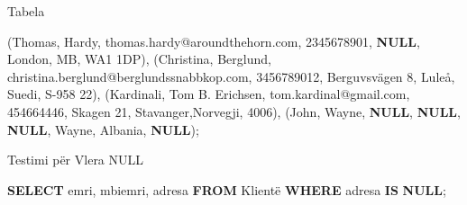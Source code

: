 \documentclass[
  ignorenonframetext,
]{beamer}
\newenvironment{Shaded}{\begin{snugshade}}{\end{snugshade}}
\newcommand{\KeywordTok}[1]{\textcolor[rgb]{0.13,0.29,0.53}{\textbf{#1}}}
\newcommand{\NormalTok}[1]{#1}
\newcommand{\StringTok}[1]{\textcolor[rgb]{0.31,0.60,0.02}{#1}}
\begin{document}
\begin{frame}[fragile]{Tabela}
\begin{Shaded}
\begin{Highlighting}[]
\NormalTok{(}\StringTok{\textquotesingle{}Thomas\textquotesingle{}}\NormalTok{, }\StringTok{\textquotesingle{}Hardy\textquotesingle{}}\NormalTok{, }\StringTok{\textquotesingle{}thomas.hardy@aroundthehorn.com\textquotesingle{}}\NormalTok{, }\StringTok{\textquotesingle{}2345678901\textquotesingle{}}\NormalTok{, }\KeywordTok{NULL}\NormalTok{, }\StringTok{\textquotesingle{}London\textquotesingle{}}\NormalTok{, }\StringTok{\textquotesingle{}MB\textquotesingle{}}\NormalTok{, }\StringTok{\textquotesingle{}WA1 1DP\textquotesingle{}}\NormalTok{),}
\NormalTok{(}\StringTok{\textquotesingle{}Christina\textquotesingle{}}\NormalTok{, }\StringTok{\textquotesingle{}Berglund\textquotesingle{}}\NormalTok{, }\StringTok{\textquotesingle{}christina.berglund@berglundssnabbkop.com\textquotesingle{}}\NormalTok{, }\StringTok{\textquotesingle{}3456789012\textquotesingle{}}\NormalTok{, }\StringTok{\textquotesingle{}Berguvsvägen 8\textquotesingle{}}\NormalTok{, }\StringTok{\textquotesingle{}Luleå\textquotesingle{}}\NormalTok{, }\StringTok{\textquotesingle{}Suedi\textquotesingle{}}\NormalTok{, }\StringTok{\textquotesingle{}S{-}958 22\textquotesingle{}}\NormalTok{),}
\NormalTok{(}\StringTok{\textquotesingle{}Kardinali\textquotesingle{}}\NormalTok{, }\StringTok{\textquotesingle{}Tom B. Erichsen\textquotesingle{}}\NormalTok{, }\StringTok{\textquotesingle{}tom.kardinal@gmail.com\textquotesingle{}}\NormalTok{, }\StringTok{\textquotesingle{}454664446\textquotesingle{}}\NormalTok{, }\StringTok{\textquotesingle{}Skagen 21\textquotesingle{}}\NormalTok{, }\StringTok{\textquotesingle{}Stavanger\textquotesingle{}}\NormalTok{,}\StringTok{\textquotesingle{}Norvegji\textquotesingle{}}\NormalTok{, }\StringTok{\textquotesingle{}4006\textquotesingle{}}\NormalTok{),}
\NormalTok{(}\StringTok{\textquotesingle{}John\textquotesingle{}}\NormalTok{, }\StringTok{\textquotesingle{}Wayne\textquotesingle{}}\NormalTok{, }\KeywordTok{NULL}\NormalTok{, }\KeywordTok{NULL}\NormalTok{, }\KeywordTok{NULL}\NormalTok{, }\StringTok{\textquotesingle{}Wayne\textquotesingle{}}\NormalTok{, }\StringTok{\textquotesingle{}Albania\textquotesingle{}}\NormalTok{, }\KeywordTok{NULL}\NormalTok{);}
\end{Highlighting}
\end{Shaded}
\end{frame}

\begin{frame}[fragile]{Testimi për Vlera NULL}
\label{testimi-puxebr-vlera-null}

\begin{Shaded}
\begin{Highlighting}[]
\KeywordTok{SELECT}\NormalTok{ emri, mbiemri, adresa}
\KeywordTok{FROM}\NormalTok{ Klientë}
\KeywordTok{WHERE}\NormalTok{ adresa }\KeywordTok{IS} \KeywordTok{NULL}\NormalTok{;}
\end{Highlighting}
\end{Shaded}
\end{frame}
\end{document}
